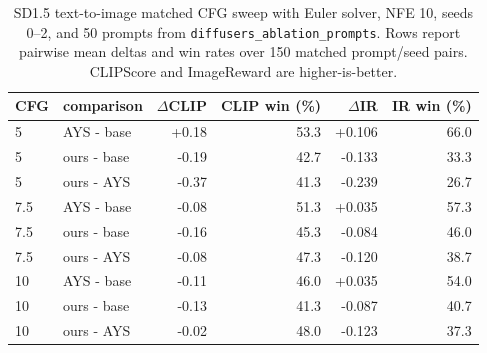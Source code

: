 \begin{table}[t]
  \centering
  \caption{SD1.5 text-to-image matched CFG sweep with Euler solver,
  NFE 10, seeds 0--2, and 50 prompts from
  \texttt{diffusers\_ablation\_prompts}. Rows report pairwise mean
  deltas and win rates over 150 matched prompt/seed pairs. CLIPScore
  and ImageReward are higher-is-better.}
  \label{tab:sd15-euler-nfe10-cfg-sweep-pairwise}
  \begin{tabular}{llrrrr}
    \toprule
    CFG & comparison & $\Delta$CLIP & CLIP win (\%) & $\Delta$IR & IR win (\%) \\
    \midrule
    5 & AYS - base & +0.18 & 53.3 & +0.106 & 66.0 \\
    5 & ours - base & -0.19 & 42.7 & -0.133 & 33.3 \\
    5 & ours - AYS & -0.37 & 41.3 & -0.239 & 26.7 \\
    7.5 & AYS - base & -0.08 & 51.3 & +0.035 & 57.3 \\
    7.5 & ours - base & -0.16 & 45.3 & -0.084 & 46.0 \\
    7.5 & ours - AYS & -0.08 & 47.3 & -0.120 & 38.7 \\
    10 & AYS - base & -0.11 & 46.0 & +0.035 & 54.0 \\
    10 & ours - base & -0.13 & 41.3 & -0.087 & 40.7 \\
    10 & ours - AYS & -0.02 & 48.0 & -0.123 & 37.3 \\
    \bottomrule
  \end{tabular}
\end{table}
